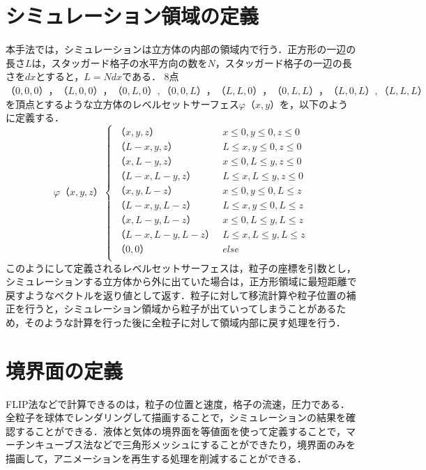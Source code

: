 \documentclass[a4j,12pt]{jreport}
\begin{document}
\section{シミュレーション領域の定義} \label{sec:levelsetserface}
本手法では，シミュレーションは立方体の内部の領域内で行う．正方形の一辺の長さ$L$は，スタッガード格子の水平方向の数を$N$，スタッガード格子の一辺の長さを$dx$とすると，$L = Ndx$である．
8点$（0,0,0），（L,0,0），（0,L,0）,（0,0,L），（L,L,0），（0,L,L），（L,0,L）,（L,L,L）$を頂点とするような立方体のレベルセットサーフェス$\varphi（x,y）$を，以下のように定義する．
\begin{equation}\label{eq:levelsetserface}
\varphi（x,y,z）
\begin{cases}
（x,y,z） & x \le0 , y \le 0,z \le 0\\
（L - x,y,z） & L \le x , y \le 0,z \le 0\\
（x,L-y,z） & x \le0 , L \le y,z \le 0\\
（L-x,L-y,z） & L \le x , L \le y,z \le 0\\
（x,y,L-z） & x \le0 , y \le 0,L \le z\\
（L - x,y,L-z） & L \le x , y \le 0,L \le z\\
（x,L-y,L-z） & x \le0 , L \le y,L \le z\\
（L-x,L-y,L-z） & L \le x , L \le y,L \le z\\
（0,0） & else\\
\end{cases}
\end{equation} 
このようにして定義されるレベルセットサーフェスは，粒子の座標を引数とし，シミュレーションする立方体から外に出ていた場合は，正方形領域に最短距離で戻すようなベクトルを返り値として返す．粒子に対して移流計算や粒子位置の補正を行うと，シミュレーション領域から粒子が出ていってしまうことがあるため，そのような計算を行った後に全粒子に対して領域内部に戻す処理を行う．

\section{境界面の定義} \label{sec:boundaly_def}
FLIP法などで計算できるのは，粒子の位置と速度，格子の流速，圧力である．全粒子を球体でレンダリングして描画することで，シミュレーションの結果を確認することができる．液体と気体の境界面を等値面を使って定義することで，マーチンキューブス法などで三角形メッシュにすることができたり，境界面のみを描画して，アニメーションを再生する処理を削減することができる．
\end{document}
